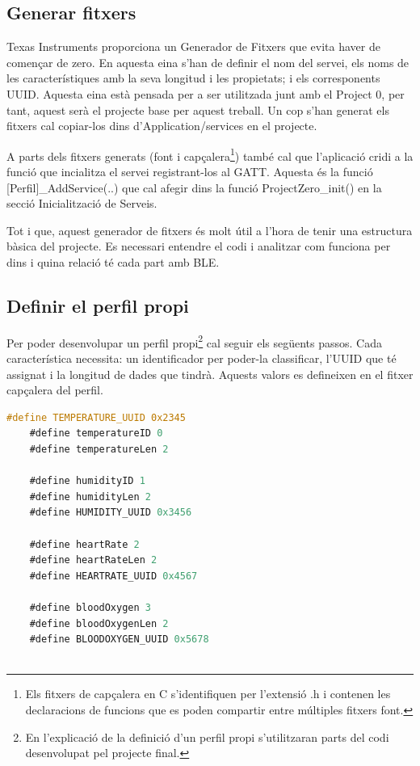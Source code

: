 \subsection{Generar fitxers}
Texas Instruments proporciona un Generador de Fitxers \cite{Service_Generator} que evita haver de començar de zero.
En aquesta eina s'han de definir el nom del servei, els noms de les característiques amb la seva longitud i les propietats; i els corresponents UUID.
Aquesta eina està pensada per a ser utilitzada junt amb el Project 0, per tant, aquest serà el projecte base per aquest treball.
Un cop s'han generat els fitxers cal copiar-los dins d'Application/services en el projecte.

A parts dels fitxers generats (font i capçalera\footnote{Els fitxers de capçalera en C s'identifiquen per l'extensió .h i contenen les declaracions de funcions que es poden compartir entre múltiples fitxers font.}) també cal que l'aplicació cridi a la funció que incialitza el servei registrant-los al GATT.
Aquesta és la funció [Perfil]\_AddService(..) que cal afegir dins la funció ProjectZero\_init() en la secció Inicialització de Serveis.

Tot i que, aquest generador de fitxers és molt útil a l'hora de tenir una estructura bàsica del projecte.
Es necessari entendre el codi i analitzar com funciona per dins i quina relació té cada part amb BLE.

\subsection{Definir el perfil propi}
Per poder desenvolupar un perfil propi\footnote{En l'explicació de la definició d'un perfil propi s'utilitzaran parts del codi desenvolupat pel projecte final.} cal seguir els següents passos.
Cada característica necessita: un identificador per poder-la classificar, l'UUID que té assignat i la longitud de dades que tindrà.
Aquests valors es defineixen en el fitxer capçalera del perfil.

\begin{lstlisting}[language=C]
	#define TEMPERATURE_UUID 0x2345
	#define temperatureID 0
	#define temperatureLen 2
	
	#define humidityID 1
	#define humidityLen 2
	#define HUMIDITY_UUID 0x3456
	
	#define heartRate 2
	#define heartRateLen 2
	#define HEARTRATE_UUID 0x4567
	
	#define bloodOxygen 3
	#define bloodOxygenLen 2
	#define BLOODOXYGEN_UUID 0x5678
	
\end{lstlisting}

